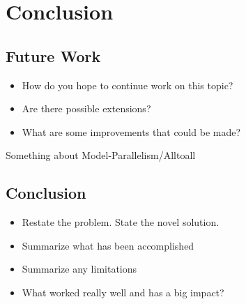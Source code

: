 
\glsresetall %
\chapter[Conclusion]{Conclusion}\label{ch:Conclusion}

\section{Future Work}
\begin{itemize}
	\item{How do you hope to continue work on this topic?}
	\item{Are there possible extensions?}
	\item{What are some improvements that could be made?}
\end{itemize}
Something about Model-Parallelism/Alltoall

\section{Conclusion}
\begin{itemize}
	\item{Restate the problem. State the novel solution.}
	\item{Summarize what has been accomplished}
	\item{Summarize any limitations}
	\item{What worked really well and has a big impact?}
\end{itemize}
